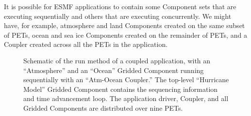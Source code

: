 It is possible for ESMF applications to contain some Component sets
that are executing sequentially and others that are executing concurrently.
We might have, for example, atmosphere and land Components created
on the same subset of PETs, ocean and sea ice Components created on
the remainder of PETs, and a Coupler created across all the PETs in
the application.

\begin{center}
\begin{figure}
\caption{Schematic of the run method of a coupled application, with an
``Atmosphere'' and an ``Ocean'' Gridded Component running sequentially with 
an ``Atm-Ocean Coupler.''  The top-level ``Hurricane Model'' 
Gridded Component contains the sequencing information and time 
advancement loop.  The application driver, Coupler, and all Gridded Components 
are distributed over nine PETs.}
\label{fig:serial}
\end{figure}
\end{center}

